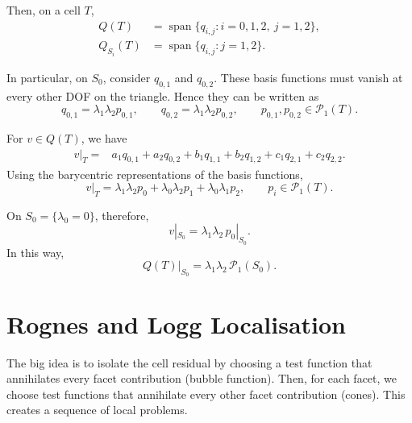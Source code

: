 \documentclass[12pt,a4paper]{article}
\newcommand{\PP}{\mathcal{P}}
\begin{document}
Then, on a cell $T$,
\begin{align}
    Q(T)&=\operatorname{span}\bigl\{q_{i,j}:i=0,1,2,\ j=1,2\bigr\},\\
    Q_{S_i}(T)&=\operatorname{span}\bigl\{q_{i,j}:j=1,2\bigr\}.
\end{align}

In particular, on $S_0$, consider $q_{0,1}$ and $q_{0,2}$. These basis functions must vanish at every other DOF on the triangle. Hence they can be written as
\begin{equation}
    q_{0,1}=\lambda_1\lambda_2 p_{0,1},\qquad
    q_{0,2}=\lambda_1\lambda_2 p_{0,2},
    \qquad p_{0,1},p_{0,2}\in\PP_1(T).
\end{equation}

For $v\in Q(T)$, we have
\begin{align}
    v|_T={}&a_1q_{0,1}+a_2q_{0,2}+b_1q_{1,1}+b_2q_{1,2}
    +c_1q_{2,1}+c_2q_{2,2}.
\end{align}
Using the barycentric representations of the basis functions,
\begin{equation}
    v|_T=\lambda_1\lambda_2 p_0
          +\lambda_0\lambda_2 p_1
          +\lambda_0\lambda_1 p_2,
    \qquad p_i\in\PP_1(T).
\end{equation}

On $S_0=\{\lambda_0=0\}$, therefore,
\begin{equation}
    v|_{S_0}=\lambda_1\lambda_2\,p_0|_{S_0}.
\end{equation}
In this way,
\begin{equation}
    Q(T)|_{S_0}=\lambda_1\lambda_2\,\PP_1(S_0).
\end{equation}

\newpage

\section{Rognes and Logg Localisation}

The big idea is to isolate the cell residual by choosing a test function that annihilates every facet contribution (bubble function). Then, for each facet, we choose test functions that annihilate every other facet contribution (cones). This creates a sequence of local problems. 
\end{document}
